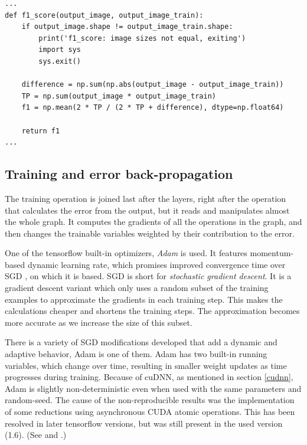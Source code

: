 \documentclass[12pt]{report}
\begin{document}
\begin{center}
	\begin{minipage}{0.95\textwidth}
		\begin{lstlisting}[title=metrics.py]
...
def f1_score(output_image, output_image_train):
	if output_image.shape != output_image_train.shape:
		print('f1_score: image sizes not equal, exiting')
		import sys
		sys.exit()

	difference = np.sum(np.abs(output_image - output_image_train))
	TP = np.sum(output_image * output_image_train)
	f1 = np.mean(2 * TP / (2 * TP + difference), dtype=np.float64)

	return f1
...
		\end{lstlisting}
	\end{minipage}
\end{center}

\subsection{Training and error back-propagation} \label{train}
The training operation is joined last after the layers, right after the operation that calculates the error from the output, but it reads and manipulates almost the whole graph. It computes the gradients of all the operations in the graph, and then changes the trainable variables weighted by their contribution to the error.

One of the tensorflow built-in optimizers, \textit{Adam} \cite{adam} is used. It features momentum-based dynamic learning rate, which promises improved convergence time over SGD \cite{sgd}, on which it is based. SGD is short for \textit{stochastic gradient descent}. It is a gradient descent variant which only uses a random subset of the training examples to approximate the gradients in each training step. This makes the calculations cheaper and shortens the training steps. The approximation becomes more accurate as we increase the size of this subset.

There is a variety of SGD modifications developed that add a dynamic and adaptive behavior, Adam is one of them. Adam has two built-in running variables, which change over time, resulting in smaller weight updates as time progresses during training. Because of cuDNN, as mentioned in section \ref{cudnn}, Adam is slightly non-deterministic even when used with the same parameters and random-seed. The cause of the non-reproducible results was the implementation of some reductions using asynchronous CUDA atomic operations. This has been resolved in later tensorflow versions, but was still present in the used version (1.6). (See \cite{nondet1} and \cite{nondet2}.)
\end{document}
